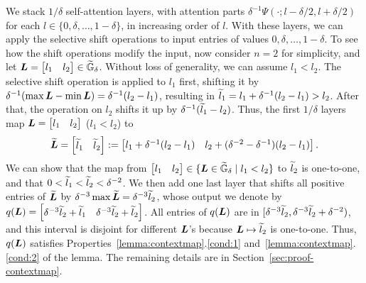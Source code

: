 We stack $1/\delta$ self-attention layers, with attention parts $\delta^{-1} \Psi(\cdot;l-\delta/2,l+\delta/2)$ for each $l \in \{0, \delta, \dots, 1-\delta\}$, in increasing order of $l$. 
With these layers, we can apply the selective shift operations to input entries of values $0, \delta, \dots, 1-\delta$.
To see how the shift operations modify the input, now consider $n = 2$ for simplicity, and let ${\bm{L}} = \begin{bmatrix} l_1 & l_2 \end{bmatrix} \in \widetilde{{\mathbb{G}}}_{\delta}$. Without loss of generality, we can assume $l_1 < l_2$.
The selective shift operation is applied to $l_1$ first, shifting it by $\delta^{-1}(\max {\bm{L}} - \min {\bm{L}}) = \delta^{-1}(l_2-l_1)$, resulting in $\widetilde{l}_1 = l_1+\delta^{-1}(l_2-l_1) > l_2$. After that, the operation on $l_2$ shifts it up by $\delta^{-1} (\widetilde{l}_1 - l_2)$. Thus, the first $1/\delta$ layers map ${\bm{L}} = \begin{bmatrix} l_1 & l_2 \end{bmatrix}$ ($l_1 < l_2$) to 
\begin{equation*}
\widetilde{{\bm{L}}} 
= \begin{bmatrix} \widetilde{l}_1 & \widetilde{l}_2 \end{bmatrix}
:= 
\begin{bmatrix} l_1+\delta^{-1}(l_2-l_1) & l_2+(\delta^{-2}-\delta^{-1})(l_2-l_1) \end{bmatrix}.
\end{equation*}
We can show that the map from $\begin{bmatrix} l_1 & l_2 \end{bmatrix} \in \{ {\bm{L}} \in \widetilde{{\mathbb{G}}}_{\delta} \mid l_1 < l_2 \}$ to $\widetilde{l}_2$ is one-to-one, and that $0 < \widetilde{l}_1 < \widetilde{l}_2 < \delta^{-2}$. 
We then add one last layer that shifts all positive entries of $\widetilde{{\bm{L}}}$ by $\delta^{-3} \max \widetilde{{\bm{L}}} = \delta^{-3} \widetilde{l}_2$, whose output we denote by $q({\bm{L}}) = \begin{bmatrix} \delta^{-3} \widetilde{l}_2 + \widetilde{l}_1 & \delta^{-3} \widetilde{l}_2 + \widetilde{l}_2 \end{bmatrix}$. 
All entries of $q({\bm{L}})$ are in $[\delta^{-3} \widetilde{l}_2, \delta^{-3} \widetilde{l}_2 + \delta^{-2})$, and this interval is disjoint for different ${\bm{L}}$'s because ${\bm{L}} \mapsto \widetilde{l}_2$ is one-to-one. Thus, $q({\bm{L}})$ satisfies Properties~\ref{lemma:contextmap}.\ref{cond:1} and~\ref{lemma:contextmap}.\ref{cond:2} of the lemma. 
The remaining details are in Section~\ref{sec:proof-contextmap}.

